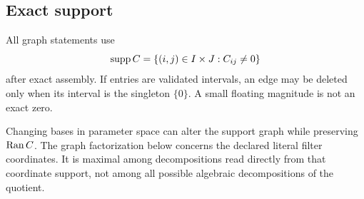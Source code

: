 \subsection{Exact support}

All graph statements use
\[
\operatorname{supp} C=\{(i,j)\in I\times J:C_{ij}\ne0\}
\]
after exact assembly. If entries are validated intervals, an edge may
be deleted only when its interval is the singleton \(\{0\}\). A small
floating magnitude is not an exact zero.

\begin{remark}
Changing bases in parameter space can alter the support graph while
preserving \(\operatorname{Ran} C\). The graph factorization below concerns the
declared literal filter coordinates. It is maximal among decompositions
read directly from that coordinate support, not among all possible
algebraic decompositions of the quotient.
\end{remark}
